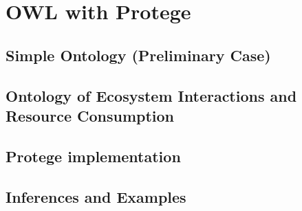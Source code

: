 \documentclass[12pt]{article}
\begin{document}
\tableofcontents

\newpage

\section{OWL with Protege}
\subsection{Simple Ontology (Preliminary Case)}


\subsection{Ontology of Ecosystem Interactions and Resource Consumption}


\subsection{Protege implementation}


\subsection{Inferences and Examples}

\end{document}
